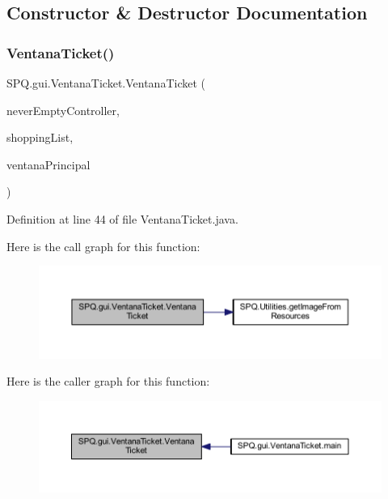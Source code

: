 \subsection{Constructor \& Destructor Documentation}
\mbox{\label{class_s_p_q_1_1gui_1_1_ventana_ticket_a27ed535b91869f2e407303220482288e}} 
\subsubsection{\texorpdfstring{Ventana\+Ticket()}{VentanaTicket()}}
{\footnotesize\ttfamily S\+P\+Q.\+gui.\+Ventana\+Ticket.\+Ventana\+Ticket (\begin{DoxyParamCaption}\item[{\mbox{\hyperlink{class_s_p_q_1_1controller_1_1_never_empty_controller}{Never\+Empty\+Controller}}}]{never\+Empty\+Controller,  }\item[{List$<$ \mbox{\hyperlink{class_s_p_q_1_1gui_1_1component_1_1_product_label}{Product\+Label}} $>$}]{shopping\+List,  }\item[{\mbox{\hyperlink{class_s_p_q_1_1gui_1_1_ventana_principal}{Ventana\+Principal}}}]{ventana\+Principal }\end{DoxyParamCaption})}



Definition at line 44 of file Ventana\+Ticket.\+java.

Here is the call graph for this function\+:
\nopagebreak
\begin{figure}[H]
\begin{center}
\leavevmode
\includegraphics[width=350pt]{class_s_p_q_1_1gui_1_1_ventana_ticket_a27ed535b91869f2e407303220482288e_cgraph}
\end{center}
\end{figure}
Here is the caller graph for this function\+:
\nopagebreak
\begin{figure}[H]
\begin{center}
\leavevmode
\includegraphics[width=350pt]{class_s_p_q_1_1gui_1_1_ventana_ticket_a27ed535b91869f2e407303220482288e_icgraph}
\end{center}
\end{figure}



